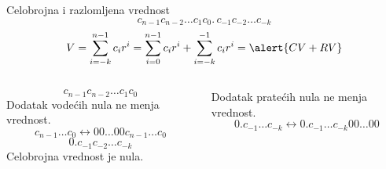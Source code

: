 \begin{frame}[label=04-s003]{Celobrojna i razlomljena vrednost}
\[c_{n-1}c_{n-2}\ldots c_1c_0.\,c_{-1}c_{-2}\ldots c_{-k}\]
\[V=\sum_{i=-k}^{n-1}c_i r^i=\sum_{i=0}^{n-1}c_i r^i+\sum_{i=-k}^{-1}c_i r^i=\alert{CV+RV}\]
\begin{columns}[T,onlytextwidth]
\[c_{n-1}c_{n-2}\ldots c_1c_0\]
Dodatak \alert{vodećih nula} ne menja vrednost.
\[c_{n-1}\ldots c_0\leftrightarrow00\ldots00c_{n-1}\ldots c_0\]
\[0.c_{-1}c_{-2}\ldots c_{-k}\]
Celobrojna vrednost je nula.\par
Dodatak \alert{pratećih nula} ne menja vrednost.
\[0.c_{-1}\ldots c_{-k}\leftrightarrow0.c_{-1}\ldots c_{-k}00\ldots00\]
\end{columns}
\end{frame}
